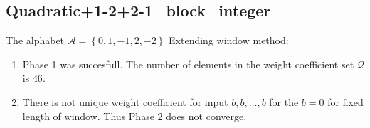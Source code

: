 \subsection{ Quadratic+1-2+2-1\_block\_integer }

\label{subsec:Quadratic+1-2+2-1blockinteger}

The alphabet $\mathcal{A} =\left\{0, 1, -1, 2, -2\right\}$
\noindent Extending window method:
\begin{enumerate}
    \item Phase 1 was succesfull.
The number of elements in the weight coefficient set $\mathcal{Q}$ is $46$.

    \item There is not unique weight coefficient for input $b,b,\dots,b$ for the $b= 0 $ for fixed length of window. Thus Phase 2 does not converge.

\end{enumerate}
